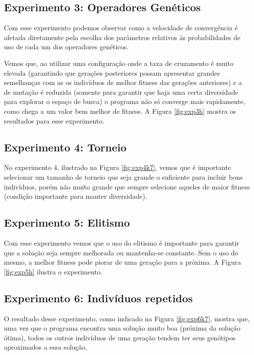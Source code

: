 \documentclass[12pt]{article}
\begin{document}
\subsection{Experimento 3: Operadores Genéticos}

Com esse experimento podemos observar como a velocidade de convergência é afetada diretamente pela
escolha dos parâmetros relativos às probabilidades de uso de cada um dos operadores genéticos.

Vemos que, ao utilizar uma configuração onde a taxa de cruzamento é muito elevada (garantindo
que gerações posteriores possam apresentar grandes semelhanças com as os indivíduos de melhor
fitness das gerações anteriores) e a de mutação é reduzida (somente para garantir que haja uma certa
diversidade para explorar o espaço de busca) o programa não só converge mais rapidamente, como
chega a um valor bem melhor de fitness. A Figura \ref{fig:exp3h} mostra os resultados para esse
experimento.

\subsection{Experimento 4: Torneio}

No experimento 4, ilustrado na Figura \ref{fig:exp4k7}, vemos que é importante selecionar um tamanho de
torneio que seja grande o suficiente para incluir bons indivíduos, porém não muito grande que sempre 
selecione aqueles de maior fitness (condição importante para manter diversidade).


\subsection{Experimento 5: Elitismo}

Com esse experimento vemos que o uso do elitismo é importante para garantir que a solução seja sempre
melhorada ou mantenha-se constante. Sem o uso do mesmo, a melhor fitness pode piorar de uma geração
para a próxima. A Figura \ref{fig:exp5h} ilustra o experimento.

\subsection{Experimento 6: Indivíduos repetidos}

O resultado desse experimento, como indicado na Figura \ref{fig:exp6k7}, mostra que, uma vez que o
programa encontra uma solução muito boa (próxima da solução ótima), todos os outros indivíduos de
uma geração tendem ter seus genótipos aproximados a essa solução.
\end{document}
